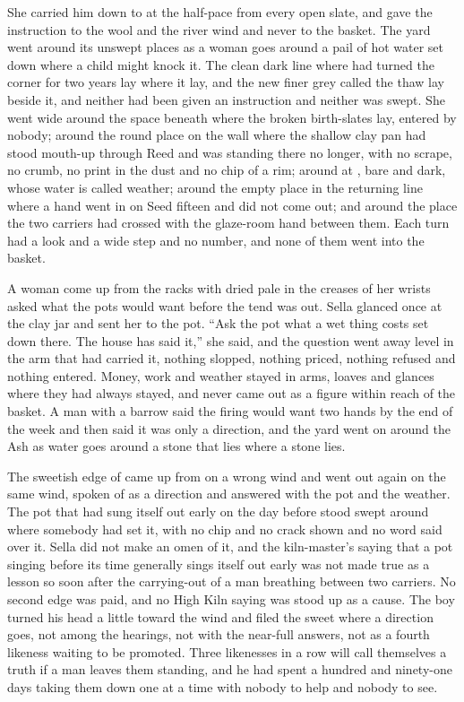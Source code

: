 She carried him down to  at the half-pace from every open slate, and gave the instruction to the wool and the river wind and never to the basket. The yard went around its unswept places as a woman goes around a pail of hot water set down where a child might knock it. The clean dark line where  had turned the corner for two years lay where it lay, and the new finer grey called the thaw lay beside it, and neither had been given an instruction and neither was swept. She went wide around the space beneath  where the broken birth-slates lay, entered by nobody; around the round place on the wall where the shallow clay pan had stood mouth-up through Reed and was standing there no longer, with no scrape, no crumb, no print in the dust and no chip of a rim; around  at , bare and dark, whose water is called weather; around the empty place in the returning line where a hand went in on Seed fifteen and did not come out; and around the place the two carriers had crossed with the glaze-room hand between them. Each turn had a look and a wide step and no number, and none of them went into the basket.

A woman come up from the racks with  dried pale in the creases of her wrists asked what the pots would want before the tend was out. Sella glanced once at the clay jar and sent her to the pot. “Ask the pot what a wet thing costs set down there. The house has said it,” she said, and the question went away level in the arm that had carried it, nothing slopped, nothing priced, nothing refused and nothing entered. Money, work and weather stayed in arms, loaves and glances where they had always stayed, and never came out as a figure within reach of the basket. A man with a barrow said the firing would want two hands by the end of the week and then said it was only a direction, and the yard went on around the Ash as water goes around a stone that lies where a stone lies.

The sweetish edge of  came up from  on a wrong wind and went out again on the same wind, spoken of as a direction and answered with the pot and the weather. The pot that had sung itself out early on the day before stood swept around where somebody had set it, with no chip and no crack shown and no word said over it. Sella did not make an omen of it, and the kiln-master's saying that a pot singing before its time generally sings itself out early was not made true as a lesson so soon after the carrying-out of a man breathing between two carriers. No second edge was paid, and no High Kiln saying was stood up as a cause. The boy turned his head a little toward the wind and filed the sweet where a direction goes, not among the hearings, not with the near-full answers, not as a fourth likeness waiting to be promoted. Three likenesses in a row will call themselves a truth if a man leaves them standing, and he had spent a hundred and ninety-one days taking them down one at a time with nobody to help and nobody to see.

